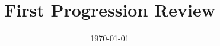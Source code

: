 \documentclass[sotoncolour]{uosthesis}      %
\title      {First Progression Review}
\date       {\today}
\begin{document}
\frontmatter
\maketitle
\begin{abstract}
\TODO
\end{abstract}

\mainmatter












%


\end{document}
